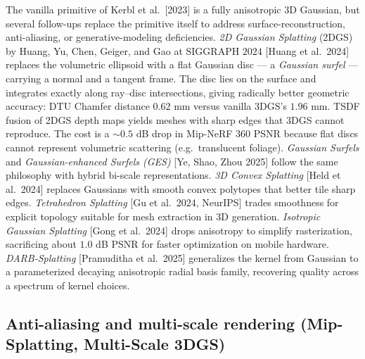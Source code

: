 The vanilla primitive of Kerbl et al.~{[}2023{]} is a fully anisotropic 3D Gaussian, but several follow-ups replace the primitive itself to address surface-reconstruction, anti-aliasing, or generative-modeling deficiencies. \emph{2D Gaussian Splatting} (2DGS) by Huang, Yu, Chen, Geiger, and Gao at SIGGRAPH \(2024\) {[}Huang et al.~2024{]} replaces the volumetric ellipsoid with a flat Gaussian disc --- a \emph{Gaussian surfel} --- carrying a normal and a tangent frame. The disc lies on the surface and integrates exactly along ray--disc intersections, giving radically better geometric accuracy: DTU Chamfer distance \(0.62\) mm versus vanilla 3DGS's \(1.96\) mm. TSDF fusion of 2DGS depth maps yields meshes with sharp edges that 3DGS cannot reproduce. The cost is a \(\sim\!0.5\) dB drop in Mip-NeRF 360 PSNR because flat discs cannot represent volumetric scattering (e.g.~translucent foliage). \emph{Gaussian Surfels} and \emph{Gaussian-enhanced Surfels (GES)} {[}Ye, Shao, Zhou 2025{]} follow the same philosophy with hybrid bi-scale representations. \emph{3D Convex Splatting} {[}Held et al.~2024{]} replaces Gaussians with smooth convex polytopes that better tile sharp edges. \emph{Tetrahedron Splatting} {[}Gu et al.~2024, NeurIPS{]} trades smoothness for explicit topology suitable for mesh extraction in 3D generation. \emph{Isotropic Gaussian Splatting} {[}Gong et al.~2024{]} drops anisotropy to simplify rasterization, sacrificing about \(1.0\) dB PSNR for faster optimization on mobile hardware. \emph{DARB-Splatting} {[}Pramuditha et al.~2025{]} generalizes the kernel from Gaussian to a parameterized decaying anisotropic radial basis family, recovering quality across a spectrum of kernel choices.

\subsection{Anti-aliasing and multi-scale rendering (Mip-Splatting, Multi-Scale 3DGS)}\label{anti-aliasing-and-multi-scale-rendering-mip-splatting-multi-scale-3dgs}

